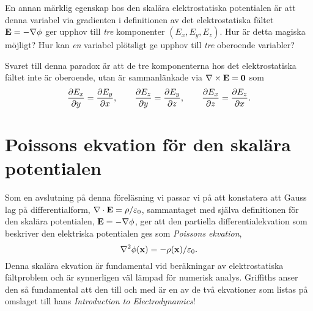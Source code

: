En annan m{\"a}rklig egenskap hos den skal{\"a}ra elektrostatiska potentialen {\"a}r att denna variabel via gradienten i definitionen av det elektrostatiska f{\"a}ltet ${\bf E}=-\nabla\phi$ ger upphov till {\it tre} komponenter $(E_x,E_y,E_z)$. Hur {\"a}r detta magiska m{\"o}jligt? Hur kan {\it en} variabel pl{\"o}tsligt ge upphov till {\it tre} oberoende variabler?

Svaret till denna paradox {\"a}r att de tre komponenterna hos det elektrostatiska f{\"a}ltet inte {\"a}r oberoende, utan {\"a}r sammanl{\"a}nkade via $\nabla\times{\bf E}={\bf 0}$ som
$$
  {{\partial E_x}\over{\partial y}}={{\partial E_y}\over{\partial x}},\qquad
  {{\partial E_z}\over{\partial y}}={{\partial E_y}\over{\partial z}},\qquad
  {{\partial E_x}\over{\partial z}}={{\partial E_z}\over{\partial x}}.
$$

\section{Poissons ekvation f{\"o}r den skal{\"a}ra potentialen}
Som en avslutning p{\aa} denna f{\"o}rel{\"a}sning vi passar vi p{\aa} att konstatera att Gauss lag p{\aa} differentialform, $\nabla\cdot{\bf E}=\rho/\varepsilon_0$, sammantaget med sj{\"a}lva definitionen f{\"o}r den skal{\"a}ra potentialen, ${\bf E}=-\nabla\phi$, ger att den partiella differentialekvation som beskriver den elektriska potentialen ges som {\it Poissons ekvation},
$$
  \nabla^2\phi({\bf x})=-\rho({\bf x})/\varepsilon_0.
$$
Denna skal{\"a}ra ekvation {\"a}r fundamental vid ber{\"a}kningar av elektrostatiska f{\"a}ltproblem och {\"a}r synnerligen v{\"a}l l{\"a}mpad f{\"o}r numerisk analys. Griffiths anser den s{\aa} fundamental att den till och med {\"a}r en av de tv{\aa} ekvationer som listas p{\aa} omslaget till hans {\it Introduction to Electrodynamics}!
\vfill\eject

